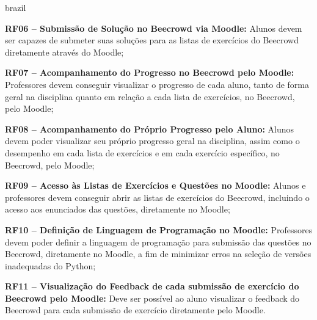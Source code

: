\begin{otherlanguage*}{brazil}
\vspace{12pt}

\textbf{RF06 – Submissão de Solução no Beecrowd via Moodle:} Alunos devem ser capazes de submeter suas soluções para as listas de exercícios do Beecrowd diretamente através do Moodle;

\vspace{12pt}

\textbf{RF07 – Acompanhamento do Progresso no Beecrowd pelo Moodle:} Professores devem conseguir visualizar o progresso de cada aluno, tanto de forma geral na disciplina quanto em relação a cada lista de exercícios, no Beecrowd, pelo Moodle;

\vspace{12pt}

\textbf{RF08 – Acompanhamento do Próprio Progresso pelo Aluno:} Alunos devem poder visualizar seu próprio progresso geral na disciplina, assim como o desempenho em cada lista de exercícios e em cada exercício específico, no Beecrowd, pelo Moodle;

\vspace{12pt}

\textbf{RF09 – Acesso às Listas de Exercícios e Questões no Moodle:} Alunos e professores devem conseguir abrir as listas de exercícios do Beecrowd, incluindo o acesso aos enunciados das questões, diretamente no Moodle;

\vspace{12pt}

\textbf{RF10 – Definição de Linguagem de Programação no Moodle:} Professores devem poder definir a linguagem de programação para submissão das questões no Beecrowd, diretamente no Moodle, a fim de minimizar erros na seleção de versões inadequadas do Python;

\vspace{12pt}

\textbf{RF11 – Visualização do Feedback de cada submissão de exercício do Beecrowd pelo Moodle:} Deve ser possível ao aluno visualizar o feedback do Beecrowd para cada submissão de exercício diretamente pelo Moodle.

\end{otherlanguage*}

